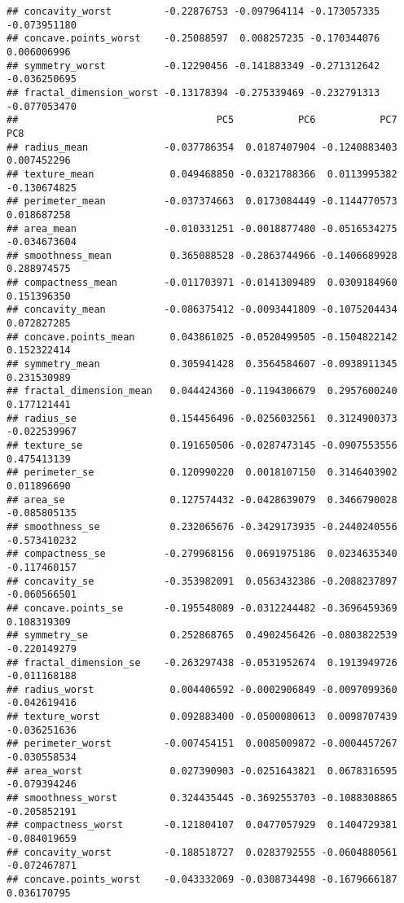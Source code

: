 \documentclass[
]{article}
\begin{document}
\begin{verbatim}
## concavity_worst         -0.22876753 -0.097964114 -0.173057335 -0.073951180
## concave.points_worst    -0.25088597  0.008257235 -0.170344076  0.006006996
## symmetry_worst          -0.12290456 -0.141883349 -0.271312642 -0.036250695
## fractal_dimension_worst -0.13178394 -0.275339469 -0.232791313 -0.077053470
##                                  PC5           PC6           PC7          PC8
## radius_mean             -0.037786354  0.0187407904 -0.1240883403  0.007452296
## texture_mean             0.049468850 -0.0321788366  0.0113995382 -0.130674825
## perimeter_mean          -0.037374663  0.0173084449 -0.1144770573  0.018687258
## area_mean               -0.010331251 -0.0018877480 -0.0516534275 -0.034673604
## smoothness_mean          0.365088528 -0.2863744966 -0.1406689928  0.288974575
## compactness_mean        -0.011703971 -0.0141309489  0.0309184960  0.151396350
## concavity_mean          -0.086375412 -0.0093441809 -0.1075204434  0.072827285
## concave.points_mean      0.043861025 -0.0520499505 -0.1504822142  0.152322414
## symmetry_mean            0.305941428  0.3564584607 -0.0938911345  0.231530989
## fractal_dimension_mean   0.044424360 -0.1194306679  0.2957600240  0.177121441
## radius_se                0.154456496 -0.0256032561  0.3124900373 -0.022539967
## texture_se               0.191650506 -0.0287473145 -0.0907553556  0.475413139
## perimeter_se             0.120990220  0.0018107150  0.3146403902  0.011896690
## area_se                  0.127574432 -0.0428639079  0.3466790028 -0.085805135
## smoothness_se            0.232065676 -0.3429173935 -0.2440240556 -0.573410232
## compactness_se          -0.279968156  0.0691975186  0.0234635340 -0.117460157
## concavity_se            -0.353982091  0.0563432386 -0.2088237897 -0.060566501
## concave.points_se       -0.195548089 -0.0312244482 -0.3696459369  0.108319309
## symmetry_se              0.252868765  0.4902456426 -0.0803822539 -0.220149279
## fractal_dimension_se    -0.263297438 -0.0531952674  0.1913949726 -0.011168188
## radius_worst             0.004406592 -0.0002906849 -0.0097099360 -0.042619416
## texture_worst            0.092883400 -0.0500080613  0.0098707439 -0.036251636
## perimeter_worst         -0.007454151  0.0085009872 -0.0004457267 -0.030558534
## area_worst               0.027390903 -0.0251643821  0.0678316595 -0.079394246
## smoothness_worst         0.324435445 -0.3692553703 -0.1088308865 -0.205852191
## compactness_worst       -0.121804107  0.0477057929  0.1404729381 -0.084019659
## concavity_worst         -0.188518727  0.0283792555 -0.0604880561 -0.072467871
## concave.points_worst    -0.043332069 -0.0308734498 -0.1679666187  0.036170795

\end{verbatim}
\end{document}
